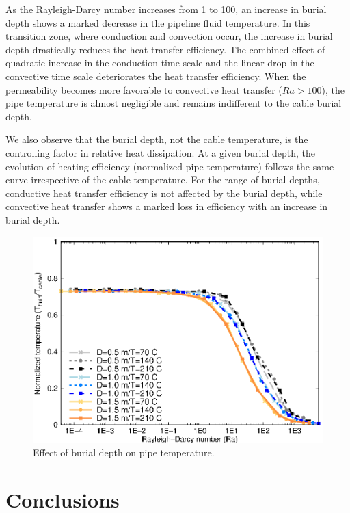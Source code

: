 \documentclass[Journal,letterpaper,InsideFigs]{ascelike-new}
\begin{document}
As the Rayleigh-Darcy number increases from 1 to 100, an increase in burial depth shows a marked decrease in the pipeline fluid temperature. In this transition zone, where conduction and convection occur, the increase in burial depth drastically reduces the heat transfer efficiency. The combined effect of quadratic increase in the conduction time scale and the linear drop in the convective time scale deteriorates the heat transfer efficiency. When the permeability becomes more favorable to convective heat transfer ($Ra > 100$), the pipe temperature is almost negligible and remains indifferent to the cable burial depth.

We also observe that the burial depth, not the cable temperature, is the controlling factor in relative heat dissipation. At a given burial depth, the evolution of heating efficiency (normalized pipe temperature) follows the same curve irrespective of the cable temperature. For the range of burial depths, conductive heat transfer efficiency is not affected by the burial depth, while convective heat transfer shows a marked loss in efficiency with an increase in burial depth.

\begin{figure}
    \centering
    \includegraphics{figs/ra-tnorm-depth.eps}
    \caption{Effect of burial depth on pipe temperature.}
    \label{fig:ra-tnorm-depth}
\end{figure}

\section{Conclusions}
\end{document}
